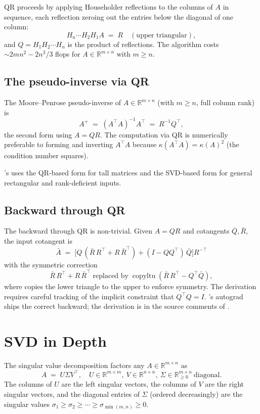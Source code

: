 QR proceeds by applying Householder reflections to the columns of
$A$ in sequence, each reflection zeroing out the entries below
the diagonal of one column:
\[
H_n \cdots H_2 H_1 A \;=\; R \quad (\text{upper triangular}),
\]
and $Q = H_1 H_2 \cdots H_n$ is the product of reflections. The
algorithm costs $\sim 2 m n^2 - 2 n^3 / 3$ flops for
$A \in \mathbb{R}^{m \times n}$ with $m \geq n$.

\subsection{The pseudo-inverse via QR}
\label{ssec:linalg:pinv_qr}

The Moore--Penrose pseudo-inverse of $A \in \mathbb{R}^{m \times
n}$ (with $m \geq n$, full column rank) is
\[
A^+ \;=\; (A^\top A)^{-1} A^\top \;=\; R^{-1} Q^\top,
\]
the second form using $A = QR$. The computation via QR is
numerically preferable to forming and inverting $A^\top A$
because $\kappa(A^\top A) = \kappa(A)^2$ (the condition number
squares).

\Lucid's  uses the QR-based form for tall
matrices and the SVD-based form for general rectangular and
rank-deficient inputs.

\subsection{Backward through QR}
\label{ssec:linalg:qr_backward}

The backward through QR is non-trivial. Given $A = QR$ and
cotangents $\bar Q, \bar R$, the input cotangent is
\[
\bar A \;=\; \bigl[Q\,(\bar R\, R^\top + R\, \bar R^\top) +
(I - Q Q^\top)\, \bar Q\bigr] R^{-\top}
\]
with the symmetric correction
\[
\bar R\, R^\top + R\, \bar R^\top
\;\text{replaced by}\;
\operatorname{copyltu}(\bar R\, R^\top - Q^\top \bar Q),
\]
where  copies the lower triangle to the upper to
enforce symmetry. The derivation requires careful tracking of the
implicit constraint that $Q^\top Q = I$. \Lucid's autograd ships
the correct backward; the derivation is in the source comments of
.

\section{SVD in Depth}
\label{sec:linalg:svd_detail}

The singular value decomposition factors any $A \in
\mathbb{R}^{m \times n}$ as
\[
A \;=\; U \Sigma V^\top, \quad
U \in \mathbb{R}^{m \times m},\ V \in \mathbb{R}^{n \times n},\
\Sigma \in \mathbb{R}_{\geq 0}^{m \times n}\ \text{diagonal}.
\]
The columns of $U$ are the left singular vectors, the columns of
$V$ are the right singular vectors, and the diagonal entries of
$\Sigma$ (ordered decreasingly) are the singular values
$\sigma_1 \geq \sigma_2 \geq \cdots \geq \sigma_{\min(m,n)} \geq
0$.

